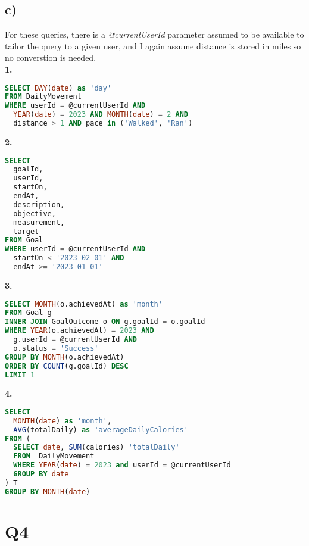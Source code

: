 \documentclass{article}
\begin{document}
\subsection*{\small c)}
For these queries, there is a {\em @currentUserId} parameter assumed to be available to tailor the query to a given user, and I again assume distance is stored in miles so no converstion is needed. \\
\newline
\textbf{\small{1.}}
\begin{lstlisting}[language=sql]
SELECT DAY(date) as 'day'
FROM DailyMovement 
WHERE userId = @currentUserId AND 
  YEAR(date) = 2023 AND MONTH(date) = 2 AND 
  distance > 1 AND pace in ('Walked', 'Ran')
\end{lstlisting}
\textbf{\small{2.}}
\begin{lstlisting}[language=sql]
SELECT 
  goalId, 
  userId, 
  startOn, 
  endAt, 
  description, 
  objective, 
  measurement, 
  target
FROM Goal 
WHERE userId = @currentUserId AND 
  startOn < '2023-02-01' AND 
  endAt >= '2023-01-01'
\end{lstlisting}
\textbf{\small{3.}}
\begin{lstlisting}[language=sql]
SELECT MONTH(o.achievedAt) as 'month'
FROM Goal g
INNER JOIN GoalOutcome o ON g.goalId = o.goalId
WHERE YEAR(o.achievedAt) = 2023 AND 
  g.userId = @currentUserId AND 
  o.status = 'Success'
GROUP BY MONTH(o.achievedAt)
ORDER BY COUNT(g.goalId) DESC
LIMIT 1
\end{lstlisting}
\textbf{\small{4.}}
\begin{lstlisting}[language=sql]
SELECT 
  MONTH(date) as 'month', 
  AVG(totalDaily) as 'averageDailyCalories'
FROM (
  SELECT date, SUM(calories) 'totalDaily'
  FROM  DailyMovement 
  WHERE YEAR(date) = 2023 and userId = @currentUserId
  GROUP BY date
) T
GROUP BY MONTH(date)
\end{lstlisting}

\pagebreak

\section*{Q4}
\end{document}
